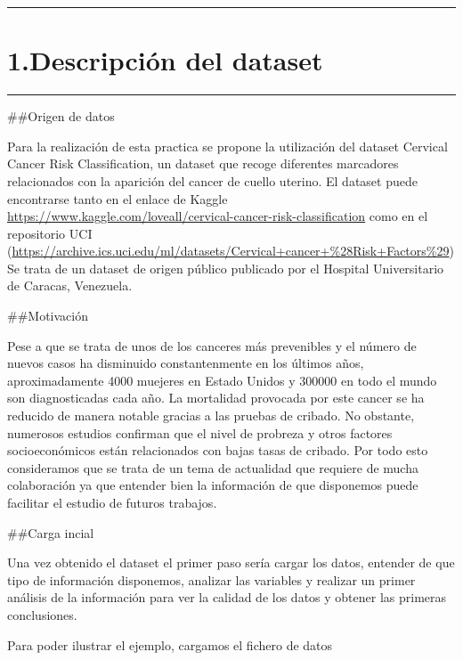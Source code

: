\documentclass[
]{article}
\begin{document}
\newpage

\begin{center}\rule{0.5\linewidth}{0.5pt}\end{center}

\hypertarget{descripciuxf3n-del-dataset}{%
\section{1.Descripción del dataset}\label{descripciuxf3n-del-dataset}}

\begin{center}\rule{0.5\linewidth}{0.5pt}\end{center}

\#\#Origen de datos

Para la realización de esta practica se propone la utilización del
dataset Cervical Cancer Risk Classification, un dataset que recoge
diferentes marcadores relacionados con la aparición del cancer de cuello
uterino. El dataset puede encontrarse tanto en el enlace de Kaggle
\url{https://www.kaggle.com/loveall/cervical-cancer-risk-classification}
como en el repositorio UCI
(\url{https://archive.ics.uci.edu/ml/datasets/Cervical+cancer+\%28Risk+Factors\%29})
Se trata de un dataset de origen público publicado por el Hospital
Universitario de Caracas, Venezuela.

\#\#Motivación

Pese a que se trata de unos de los canceres más prevenibles y el número
de nuevos casos ha disminuido constantenmente en los últimos años,
aproximadamente 4000 muejeres en Estado Unidos y 300000 en todo el mundo
son diagnosticadas cada año. La mortalidad provocada por este cancer se
ha reducido de manera notable gracias a las pruebas de cribado. No
obstante, numerosos estudios confirman que el nivel de probreza y otros
factores socioeconómicos están relacionados con bajas tasas de cribado.
Por todo esto consideramos que se trata de un tema de actualidad que
requiere de mucha colaboración ya que entender bien la información de
que disponemos puede facilitar el estudio de futuros trabajos.

\#\#Carga incial

Una vez obtenido el dataset el primer paso sería cargar los datos,
entender de que tipo de información disponemos, analizar las variables y
realizar un primer análisis de la información para ver la calidad de los
datos y obtener las primeras conclusiones.

Para poder ilustrar el ejemplo, cargamos el fichero de datos
\end{document}
